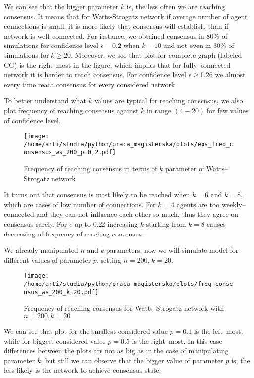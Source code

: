 \documentclass{article}
\begin{document}
We can see that the bigger parameter $k$ is, the less often we are reaching consensus. It means that for Watts-Strogatz network if average number of agent connections is small, it is more likely that consensus will establish, than if network is well--connected. For instance, we obtained consensus in 80\% of simulations for confidence level $\epsilon=0.2$ when $k=10$ and not even in 30\% of simulations for $k\geq20$.
\indent
Moreover, we see that plot for complete graph (labeled CG) is the right--most in the figure, which implies that for fully--connected network it is harder to reach consensus. For confidence level $\epsilon\geq0.26$ we almost every time reach consensus for every considered network.

\indent


To better understand what $k$ values are typical for reaching consensus, we also plot frequency of reaching consensus against $k$ in range $(4-20)$ for few values of confidence level.

\begin{figure}[H]
		\centering
		\texttt{[image: /home/arti/studia/python/praca\_magisterska/plots/eps\_freq\_consensus\_ws\_200\_p=0,2.pdf]}
		\caption{Frequency of reaching consensus in terms of $k$ parameter of Watts--Strogatz network}
\end{figure}

It turns out that consensus is most likely to be reached when $k=6$ and $k=8$, which are cases of low number of connections. For $k=4$ agents are too weekly--connected and they can not influence each other so much, thus they agree on consensus rarely. For $\epsilon$ up to $0.22$ increasing $k$ starting from $k=8$ causes decreasing of frequency of reaching consensus.

\indent

We already manipulated $n$ and $k$ parameters, now we will simulate model for different values of parameter $p$, setting $n=200$, $k=20$.

\begin{figure}[H]
		\centering
		\texttt{[image: /home/arti/studia/python/praca\_magisterska/plots/freq\_consensus\_ws\_200\_k=20.pdf]}
		\caption{Frequency of reaching consensus for Watts--Strogatz network with $n=200, k=20$}
\end{figure}

We can see that plot for the smallest considered value $p=0.1$ is the left--most, while for biggest considered value $p=0.5$ is the right--most. In this case differences between the plots are not as big as in the case of manipulating parameter $k$, but still we can observe that the bigger value of parameter $p$ is, the less likely is the network to achieve consensus state.
\end{document}
